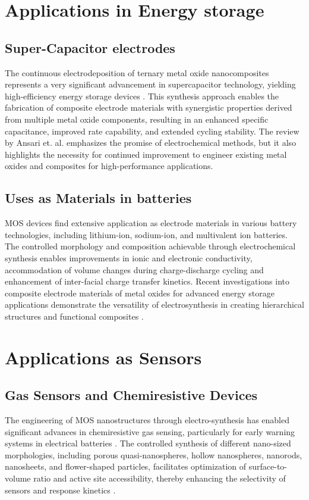 \documentclass[12pt,a4paper]{report}
\begin{document}
	\section{Applications in Energy storage}
	\subsection{Super-Capacitor electrodes}
    The continuous electrodeposition of ternary metal oxide nanocomposites represents a very significant advancement in supercapacitor technology, yielding high-efficiency energy storage devices \cite{Ansari12111873}. This synthesis approach enables the fabrication of composite electrode materials with synergistic properties derived from multiple metal oxide components, resulting in an enhanced specific capacitance, improved rate capability, and extended cycling stability. The review by Ansari et. al. emphasizes the promise of electrochemical methods, but it also highlights the necessity for continued improvement to engineer existing metal oxides and composites for high-performance applications.  

	\subsection{Uses as Materials in batteries}
	MOS devices find extensive application as electrode materials in various battery technologies, including lithium-ion, sodium-ion, and multivalent ion batteries. The controlled morphology and composition achievable through electrochemical synthesis enables improvements in ionic and electronic conductivity, accommodation of volume changes during charge-discharge cycling and enhancement of inter-facial charge transfer kinetics. Recent investigations into composite electrode materials of metal oxides for advanced energy storage applications demonstrate the versatility of electrosynthesis in creating hierarchical structures and functional composites \cite{Pazhamalai2024}.
	
	\section{Applications as Sensors}
	
	\subsection{Gas Sensors and Chemiresistive Devices}
	The engineering of MOS nanostructures through electro-synthesis has enabled significant advances in chemiresistive gas sensing, particularly for early warning systems in electrical batteries \cite{PingLi2025}. The controlled synthesis of different nano-sized morphologies, including porous quasi-nanospheres, hollow nanospheres, nanorods, nanosheets, and flower-shaped particles, facilitates optimization of surface-to-volume ratio and active site accessibility, thereby enhancing the selectivity of sensors and response kinetics \cite{Dutta2023}. 
	
\end{document}
